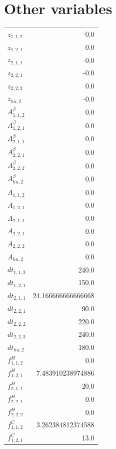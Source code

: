 \documentclass{article}%
\makeatletter
\let\mcnewpage=\newpage%
\newcommand{\TrickSupertabularIntoMulticols}{%
\renewcommand\newpage{%
\if@firstcolumn%
\hrule width\linewidth height0pt%
\columnbreak%
\else%
\mcnewpage%
\fi%
}%
}%
\makeatother
\begin{document}
\section{Other variables}%
\thispagestyle{plain}%
\begin{multicols*}{3}%
\TrickSupertabularIntoMulticols%
%
\begin{supertabular}{lr}%
	$z_{1,1,2}$ & -0.0 \\%
	$z_{1,2,1}$ & -0.0 \\%
	$z_{2,1,1}$ & -0.0 \\%
	$z_{2,2,1}$ & -0.0 \\%
	$z_{2,2,2}$ & 0.0 \\%
	$z_{hu,2}$ & -0.0 \\%
	$A_{1,1,2}^{\beta}$ & 0.0 \\%
	$A_{1,2,1}^{\beta}$ & 0.0 \\%
	$A_{2,1,1}^{\beta}$ & 0.0 \\%
	$A_{2,2,1}^{\beta}$ & 0.0 \\%
	$A_{2,2,2}^{\beta}$ & 0.0 \\%
	$A_{hu,2}^{\beta}$ & 0.0 \\%
	$A_{1,1,2}$ & 0.0 \\%
	$A_{1,2,1}$ & 0.0 \\%
	$A_{2,1,1}$ & 0.0 \\%
	$A_{2,2,1}$ & 0.0 \\%
	$A_{2,2,2}$ & 0.0 \\%
	$A_{hu,2}$ & 0.0 \\%
	$dt_{1,1,3}$ & 240.0 \\%
	$dt_{1,2,1}$ & 150.0 \\%
	$dt_{2,1,1}$ & 24.166666666666668 \\%
	$dt_{2,2,1}$ & 90.0 \\%
	$dt_{2,2,2}$ & 220.0 \\%
	$dt_{2,2,3}$ & 240.0 \\%
	$dt_{hu,2}$ & 180.0 \\%
	$f_{1,1,2}^{H}$ & 0.0 \\%
	$f_{1,2,1}^{H}$ & 7.483910238974886 \\%
	$f_{2,1,1}^{H}$ & 20.0 \\%
	$f_{2,2,1}^{H}$ & 0.0 \\%
	$f_{2,2,2}^{H}$ & 0.0 \\%
	$f_{1,1,2}^{C}$ & 3.262384812374588 \\%
	$f_{1,2,1}^{C}$ & 13.0 \\%

\end{supertabular}
\end{multicols*}
\end{document}
